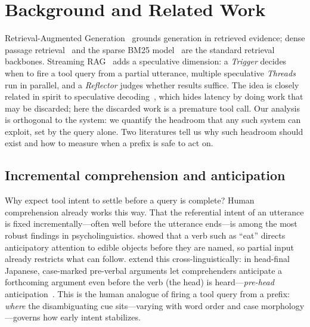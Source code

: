 \documentclass[11pt]{article}
\renewcommand{\cite}{\citep}                         %
\begin{document}
\section{Background and Related Work}
Retrieval-Augmented Generation~\cite{lewis2020rag} grounds generation in
retrieved evidence; dense passage retrieval~\cite{karpukhin2020dpr} and the
sparse BM25 model~\cite{robertson2009bm25} are the standard retrieval backbones.
Streaming RAG~\cite{arora2025streamrag} adds a speculative dimension: a
\emph{Trigger} decides when to fire a tool query from a partial utterance,
multiple speculative \emph{Threads} run in parallel, and a \emph{Reflector}
judges whether results suffice. The idea is closely related in spirit to
speculative decoding~\cite{leviathan2023speculative}, which hides latency by
doing work that may be discarded; here the discarded work is a premature tool
call. Our analysis is orthogonal to the system: we quantify the headroom that any
such system can exploit, set by the query alone. Two literatures tell us why such
headroom should exist and how to measure when a prefix is safe to act on.

\subsection{Incremental comprehension and anticipation}
Why expect tool intent to settle before a query is complete? Human comprehension
already works this way. That the referential
intent of an utterance is fixed incrementally---often well before the utterance
ends---is among the most robust findings in psycholinguistics.
\citet{altmann1999incremental} showed that a verb such as ``eat'' directs
anticipatory attention to edible objects before they are named, so partial input
already restricts what can follow. \citet{kamide2003timecourse} extend this
cross-linguistically: in head-final Japanese, case-marked pre-verbal arguments let
comprehenders anticipate a forthcoming argument even before the verb (the head) is
heard---\emph{pre-head} anticipation~\cite{kamide1999prehead}. This is the human
analogue of firing a tool query from a prefix: \emph{where} the disambiguating
cue sits---varying with word order and case morphology---governs how early intent
stabilizes.
\end{document}
